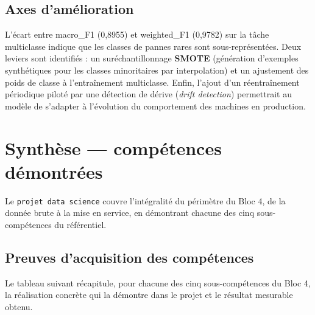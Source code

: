 \documentclass[11pt]{article}
\begin{document}
\subsection{Axes d'amélioration}

L'écart entre macro\_F1 (0,8955) et weighted\_F1 (0,9782) sur la tâche multiclasse
indique que les classes de pannes rares sont sous-représentées. Deux leviers sont
identifiés : un suréchantillonnage \textbf{SMOTE} (génération d'exemples synthétiques
pour les classes minoritaires par interpolation) et un ajustement des poids de classe
à l'entraînement multiclasse. Enfin, l'ajout d'un réentraînement périodique piloté par
une détection de dérive (\textit{drift detection}) permettrait au modèle de s'adapter
à l'évolution du comportement des machines en production.

\section{Synthèse --- compétences démontrées}

Le \texttt{projet data science} couvre l'intégralité du périmètre du Bloc 4,
de la donnée brute à la mise en service, en démontrant chacune des cinq
sous-compétences du référentiel.

\subsection{Preuves d'acquisition des compétences}
\label{sec:preuves}

Le tableau suivant récapitule, pour chacune des cinq sous-compétences du Bloc 4, la
réalisation concrète qui la démontre dans le projet et le résultat mesurable obtenu.
\end{document}
